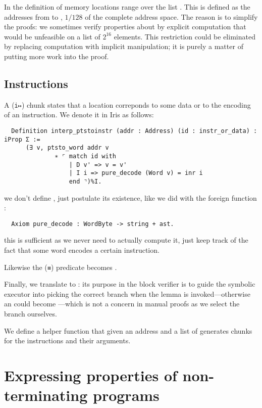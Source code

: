 In the definition of  memory locations range over the list . This is defined as the addresses from  to , \(1/128\) of the complete address space. The reason is to simplify the proofs: we sometimes verify properties about  by explicit computation that would be unfeasible on a list of \(2^{16}\) elements. This restriction could be eliminated by replacing computation with implicit manipulation; it is purely a matter of putting more work into the proof.

\subsection{Instructions}

A  (\texttt{\small i↦}) chunk states that a location correponds to some data or to the encoding of an instruction. We denote it in Iris as follows:
\begin{verbatim}
  Definition interp_ptstoinstr (addr : Address) (id : instr_or_data) : iProp Σ :=
      (∃ v, ptsto_word addr v
              ∗ ⌜ match id with
                  | D v' => v = v'
                  | I i => pure_decode (Word v) = inr i
                  end ⌝)%I.
\end{verbatim}
we don't define , just postulate its existence, like we did with the foreign function :
\begin{verbatim}
  Axiom pure_decode : WordByte -> string + ast.
\end{verbatim}
this is sufficient as we never need to actually compute it, just keep track of the fact that some word encodes a certain instruction.

Likewise the  (\texttt{\small ≡}) predicate becomes .

Finally, we translate  to : its purpose in the block verifier is to guide the symbolic executor into picking the correct branch when the  lemma is invoked---otherwise an  could become ---which is not a concern in manual proofs as we select the branch ourselves.

We define a helper function  that given an address and a list of  generates  chunks for the instructions and their arguments.

\section{Expressing properties of non-terminating programs}
\label{sec:doubles}

